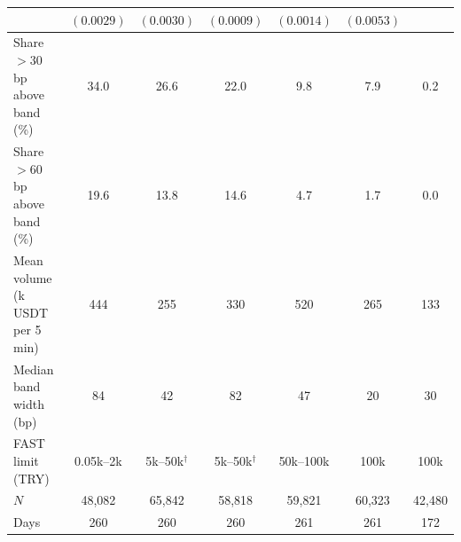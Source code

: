 \begin{tabular}{lcccccc}
 & $(0.0029)$ & $(0.0030)$ & $(0.0009)$ & $(0.0014)$ & $(0.0053)$ &  \\
\midrule
Share $>$30 bp above band (\%) & 34.0 & 26.6 & 22.0 & 9.8 & 7.9 & 0.2 \\
Share $>$60 bp above band (\%) & 19.6 & 13.8 & 14.6 & 4.7 & 1.7 & 0.0 \\
Mean volume (k USDT per 5 min) & 444 & 255 & 330 & 520 & 265 & 133 \\
Median band width (bp) & 84 & 42 & 82 & 47 & 20 & 30 \\
FAST limit (TRY) & 0.05k--2k & 5k--50k$^\dagger$ & 5k--50k$^\dagger$ & 50k--100k & 100k & 100k \\
$N$ & 48,082 & 65,842 & 58,818 & 59,821 & 60,323 & 42,480 \\
Days & 260 & 260 & 260 & 261 & 261 & 172 \\
\bottomrule
\end{tabular}
